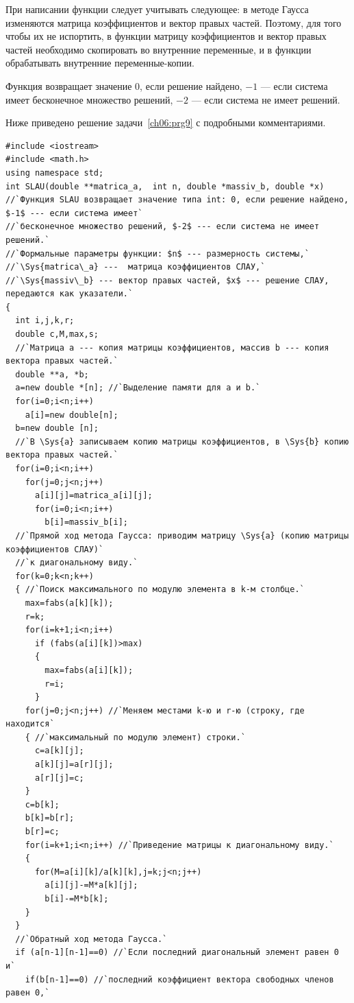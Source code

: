 При написании функции следует учитывать следующее: в методе Гаусса изменяются матрица коэффициентов и вектор правых
частей. Поэтому, для того чтобы их не испортить, в функции  матрицу коэффициентов и вектор правых частей необходимо
скопировать во внутренние переменные, и в функции обрабатывать внутренние переменные-копии.

Функция  возвращает значение 0, если решение найдено, $-1$ --- если система имеет 
бесконечное множество решений, $-2$ --- если система не имеет решений.

Ниже приведено решение задачи~\ref{ch06:prg9} с подробными комментариями.
\begin{lstlisting}
#include <iostream>
#include <math.h>
using namespace std;
int SLAU(double **matrica_a,  int n, double *massiv_b, double *x)
//`Функция SLAU возвращает значение типа int: 0, если решение найдено, $-1$ --- если система имеет`
//`бесконечное множество решений, $-2$ --- если система не имеет решений.` 
//`Формальные параметры функции: $n$ --- размерность системы,` 
//`\Sys{matrica\_a} ---  матрица коэффициентов СЛАУ,`
//`\Sys{massiv\_b} --- вектор правых частей, $x$ --- решение СЛАУ, передаются как указатели.`
{
  int i,j,k,r;
  double c,M,max,s;
  //`Матрица a --- копия матрицы коэффициентов, массив b --- копия вектора правых частей.`
  double **a, *b; 
  a=new double *[n]; //`Выделение памяти для a и b.`
  for(i=0;i<n;i++)
    a[i]=new double[n];
  b=new double [n];
  //`В \Sys{a} записываем копию матрицы коэффициентов, в \Sys{b} копию вектора правых частей.`
  for(i=0;i<n;i++)
    for(j=0;j<n;j++)
      a[i][j]=matrica_a[i][j];
      for(i=0;i<n;i++)
        b[i]=massiv_b[i];
  //`Прямой ход метода Гаусса: приводим матрицу \Sys{a} (копию матрицы коэффициентов СЛАУ)` 
  //`к диагональному виду.`
  for(k=0;k<n;k++)
  { //`Поиск максимального по модулю элемента в k-м столбце.`
    max=fabs(a[k][k]);
    r=k;
    for(i=k+1;i<n;i++)
      if (fabs(a[i][k])>max)
      {
        max=fabs(a[i][k]);
        r=i;
      }
    for(j=0;j<n;j++) //`Меняем местами k-ю и r-ю (строку, где находится`
    { //`максимальный по модулю элемент) строки.`
      c=a[k][j];
      a[k][j]=a[r][j];
      a[r][j]=c;
    }
    c=b[k];
    b[k]=b[r];
    b[r]=c;
    for(i=k+1;i<n;i++) //`Приведение матрицы к диагональному виду.`
    {
      for(M=a[i][k]/a[k][k],j=k;j<n;j++)
        a[i][j]-=M*a[k][j];
        b[i]-=M*b[k];
    }
  }
  //`Обратный ход метода Гаусса.`
  if (a[n-1][n-1]==0) //`Если последний диагональный элемент равен 0 и`
    if(b[n-1]==0) //`последний коэффициент вектора свободных членов равен 0,`

\end{lstlisting}
